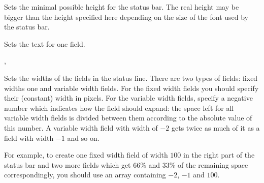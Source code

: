 


\label{wxstatusbarsetminheight}


Sets the minimal possible height for the status bar. The real height may be
bigger than the height specified here depending on the size of the font used by
the status bar.

\label{wxstatusbarsetstatustext}


Sets the text for one field.





, 

\label{wxstatusbarsetstatuswidths}


Sets the widths of the fields in the status line. There are two types of
fields: fixed widths one and variable width fields. For the fixed width fields
you should specify their (constant) width in pixels. For the variable width
fields, specify a negative number which indicates how the field should expand:
the space left for all variable width fields is divided between them according
to the absolute value of this number. A variable width field with width of $-2$
gets twice as much of it as a field with width $-1$ and so on.

For example, to create one fixed width field of width $100$ in the right part of
the status bar and two more fields which get $66$\% and $33$\% of the remaining
space correspondingly, you should use an array containing $-2$, $-1$ and $100$.

